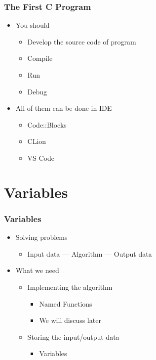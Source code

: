 \documentclass{../c-lecture}
\begin{document}
\begin{frame}
  \frametitle{The First C Program}
  \begin{itemize}
    \item You should
    \begin{itemize}
      \item Develop the source code of program
      \item Compile
      \item Run
      \item Debug
    \end{itemize}
    \item All of them can be done in IDE
    \begin{itemize}
      \item Code::Blocks
      \item CLion
      \item VS Code
    \end{itemize}
  \end{itemize}
\end{frame}

\section{Variables}

\begin{frame}
  \frametitle{Variables}
  \begin{itemize}
    \item Solving problems
    \begin{itemize}
      \item Input data --- Algorithm --- Output data
    \end{itemize}
    \item What we need
    \begin{itemize}
      \item Implementing the algorithm
      \begin{itemize}
        \item Named {\color{Orange} Functions}
        \item We will discuss later
      \end{itemize}
      \item Storing the input/output data
      \begin{itemize}
        \item {\color{Orange} Variables}
      \end{itemize}
    \end{itemize}
  \end{itemize}
\end{frame}
\end{document}
